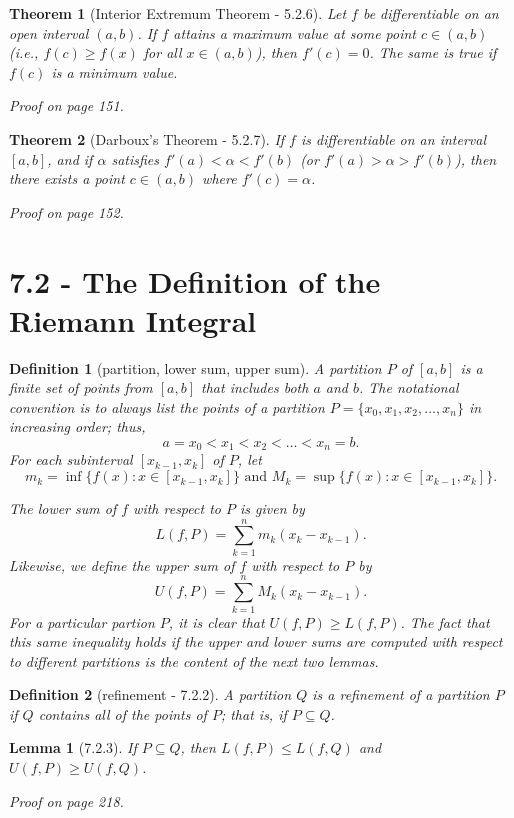 \documentclass{article}
\newtheorem{definition}{Definition}
\newtheorem{theorem}{Theorem}
\newtheorem{lemma}{Lemma}
\begin{document}
\begin{theorem}[Interior Extremum Theorem - 5.2.6]
    Let $f$ be differentiable on an open interval $(a,b)$. If $f$ attains a maximum value at some point $c \in (a,b)$ (i.e., $f(c) \geq f(x)$ for all $x \in (a,b)$), then $f'(c) = 0$. The same is true if $f(c)$ is a minimum value.

    Proof on page 151.
\end{theorem}

\begin{theorem}[Darboux's Theorem - 5.2.7]
    If $f$ is differentiable on an interval $[a,b]$, and if $\alpha$ satisfies $f'(a) < \alpha < f'(b)$ (or $f'(a) > \alpha > f'(b)$), then there exists a point $c \in (a,b)$ where $f'(c) = \alpha$.

    Proof on page 152.
\end{theorem}

\section*{7.2 - The Definition of the Riemann Integral}
\begin{definition}[partition, lower sum, upper sum]
    A \textit{partition} $P$ of $[a,b]$ is a finite set of points from $[a,b]$ that includes both $a$ and $b$. The notational convention is to always list the points of a partition $P = \{x_0,x_1,x_2,\dots , x_n\}$ in increasing order; thus, \[a = x_0 < x_1 < x_2 < \dots < x_n = b.\] For each subinterval $[x_{k-1}, x_k]$ of $P$, let \[m_k = \inf \{f(x) : x \in [x_{k-1}, x_k]\} \text{ and } M_k = \sup \{f(x):x \in [x_{k-1}, x_k]\}.\]

    The \textit{lower sum} of $f$ with respect to $P$ is given by \[L(f,P) = \sum _{k = 1}^n m_k(x_k - x_{k-1}).\] Likewise, we define the \textit{upper sum} of $f$ with respect to $P$ by \[U(f,P)=\sum _{k=1}^n M_k(x_k - x_{k-1}).\]
    For a particular partion $P$, it is clear that $U(f,P) \geq L(f,P)$. The fact that this same inequality holds if the upper and lower sums are computed with respect to different partitions is the content of the next two lemmas.
\end{definition}

\begin{definition}[refinement - 7.2.2]
    A partition $Q$ is a \textit{refinement} of a partition $P$ if $Q$ contains all of the points of $P$; that is, if $P \subseteq Q$.
\end{definition}

\begin{lemma}[7.2.3]
    If $P \subseteq Q$, then $L(f,P) \leq L(f,Q)$ and $U(f,P)\geq U(f,Q)$.

    Proof on page 218.
\end{lemma}
\end{document}
